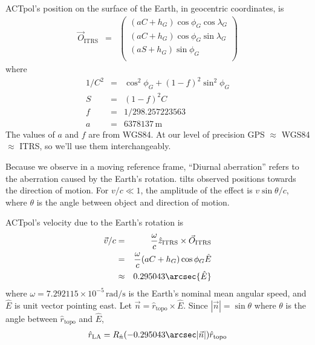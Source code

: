 \documentclass[10pt,preprint]{aastex}
\newcommand{\Ovec}{{\vec O}}
\newcommand{\rhat}{{\hat r}}
\newcommand{\east}{{\hat E}}
\newcommand{\zhat}{{\hat z}}
\newcommand{\ITRS}{\mathrm{ITRS}}
\newcommand{\LA}{\mathrm{LA}}
\newcommand{\rtopo}{{\hat r}_\mathrm{topo}}
\begin{document}
ACTpol's position on the surface of the Earth, in geocentric coordinates, is
\begin{eqnarray}
\Ovec_\ITRS &=& \left(\begin{array}{l}
(aC+h_G) \cos\phi_G \cos\lambda_G \\
(aC+h_G) \cos\phi_G \sin\lambda_G \\
(aS+h_G) \sin\phi_G \\
\end{array}\right)
\end{eqnarray}
where
\begin{eqnarray}
1/C^2 &=& \cos^2\phi_G + (1-f)^2\sin^2\phi_G \\
S &=& (1-f)^2 C \\
f &=& 1/298.257223563 \\
a &=& 6378137\,\mathrm{m}
\end{eqnarray}
The values of $a$ and $f$ are from WGS84.
At our level of precision GPS $\approx$ WGS84 $\approx$ ITRS, so we'll use them interchangeably.


Because we observe in a moving reference frame, 
``Diurnal aberration'' refers to the aberration caused by the Earth's rotation.
 tilts observed positions towards the direction of motion.
For $v/c \ll 1$, the amplitude of the effect is $v\sin\theta/c$, where $\theta$ is the angle between
object and direction of motion.

ACTpol's velocity due to the Earth's rotation is
\begin{eqnarray}
\vec v/c &=& \frac{\omega}{c}\zhat_\ITRS\times\Ovec_\ITRS
\\
&=& \frac{\omega}{c} (aC+h_G) \cos\phi_G \east
\\
&\approx& 0.295043 \arcsec\east
\end{eqnarray}
where $\omega = 7.292115\times10^{-5}\,\mathrm{rad/s}$ is the Earth's nominal mean angular speed,
and $\east$ is unit vector pointing east.
Let $\vec n = \rtopo\times\east$.
Since $|\vec n| = \sin\theta$ where $\theta$ is the angle between $\rtopo$ and $\east$,
\begin{eqnarray}
\rhat_\LA = R_{\hat n}(-0.295043 \arcsec|\vec n|) \rtopo
\end{eqnarray}

\end{document}
